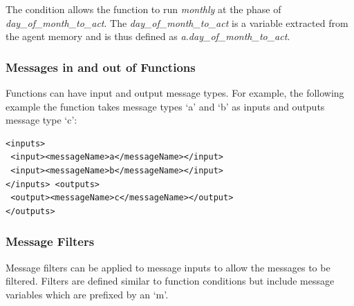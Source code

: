 \documentclass[a4paper,11pt]{article}
\newenvironment{mylisting}
{\begin{list}{}{\setlength{\leftmargin}{1em}}\item\small\bfseries}
{\end{list}}
\begin{document}
 The condition allows the function to run \emph{monthly} at the phase
 of \emph{day\_of\_month\_to\_act}. The
 \emph{day\_of\_month\_to\_act} is a variable extracted from the
 agent memory and is thus defined as
 \emph{a.day\_of\_month\_to\_act}.

%
%
\subsubsection{Messages in and out of Functions}
Functions can have input and output message types. For example, the
following example the function takes message types `a' and `b' as
inputs and outputs message type `c':

\begin{mylisting}
\begin{verbatim}
<inputs>
 <input><messageName>a</messageName></input>
 <input><messageName>b</messageName></input>
</inputs> <outputs>
 <output><messageName>c</messageName></output>
</outputs>
\end{verbatim}
\end{mylisting}

\subsubsection{Message Filters}\label{sect:msgfilter}
Message filters can be applied to message inputs to allow the
messages to be filtered. Filters are defined similar to function
conditions but include message variables which are prefixed by an
`m'.
\end{document}
